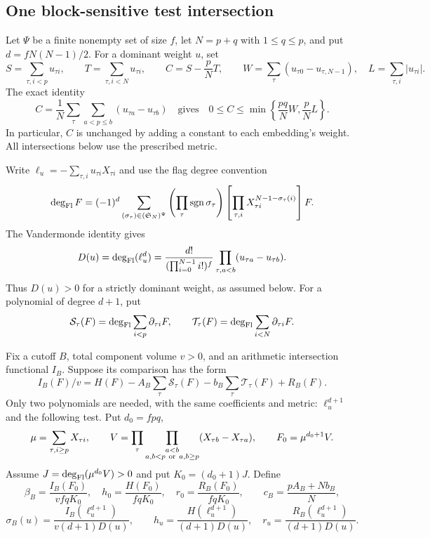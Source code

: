 \subsection{One block-sensitive test intersection}

Let $\Psi$ be a finite nonempty set of size $f$, let $N=p+q$ with
$1\le q\le p$, and put $d=fN(N-1)/2$. For a dominant weight $u$, set
\[
 S=\sum_{\tau,i<p}u_{\tau i},\qquad
 T=\sum_{\tau,i<N}u_{\tau i},\qquad C=S-\frac pN T,\qquad
 W=\sum_\tau(u_{\tau0}-u_{\tau,N-1}),\quad L=\sum_{\tau,i}|u_{\tau i}|.
\]
The exact identity
\[
 C=\frac1N\sum_\tau\sum_{a<p\le b}(u_{\tau a}-u_{\tau b})
 \quad\text{gives}\quad
 0\le C\le\min\left\{\frac{pq}{N}W,\frac pN L\right\}.
\]
In particular, $C$ is unchanged by adding a constant to each
embedding's weight. All intersections below use the prescribed metric.

Write $\ell_u=-\sum_{\tau,i}u_{\tau i}X_{\tau i}$ and use the flag
degree convention
\[
 \deg_{\rm Fl}F=(-1)^d\sum_{(\sigma_\tau)\in(\mathfrak S_N)^\Psi}
 \left(\prod_\tau\operatorname{sgn}\sigma_\tau\right)
 \left[\prod_{\tau,i}X_{\tau i}^{N-1-\sigma_\tau(i)}\right]F.
\]
The Vandermonde identity gives
\[
 D(u)=\deg_{\rm Fl}(\ell_u^d)
 =\frac{d!}{(\prod_{i=0}^{N-1}i!)^f}
             \prod_{\tau,a<b}(u_{\tau a}-u_{\tau b}).
\]
Thus $D(u)>0$ for a strictly dominant weight, as assumed below.
For a polynomial of degree $d+1$, put
\[
 \mathcal S_\tau(F)=\deg_{\rm Fl}\sum_{i<p}\partial_{\tau i}F,
 \qquad
 \mathcal T_\tau(F)=\deg_{\rm Fl}\sum_{i<N}\partial_{\tau i}F.
\]

Fix a cutoff $B$, total component volume $v>0$, and an arithmetic
intersection functional $I_B$. Suppose its comparison has the form
\begin{equation}\label{geo-two-polynomial-comparison}
 I_B(F)/v
 =H(F)-A_B\sum_\tau\mathcal S_\tau(F)
       -b_B\sum_\tau\mathcal T_\tau(F)+R_B(F).
\end{equation}
Only two polynomials are needed, with the same coefficients and metric:
$\ell_u^{d+1}$ and the following test. Put $d_0=fpq$,
\[
 \mu=\sum_{\tau,i\ge p}X_{\tau i},\qquad
 V=\prod_\tau\prod_{\substack{a<b\\a,b<p\ {\rm or}\ a,b\ge p}}
                        (X_{\tau b}-X_{\tau a}),\qquad
 F_0=\mu^{d_0+1}V.
\]
Assume $J=\deg_{\rm Fl}(\mu^{d_0}V)>0$ and put $K_0=(d_0+1)J$.
Define
\[
 \beta_B=\frac{I_B(F_0)}{vfqK_0},\quad
 h_0=\frac{H(F_0)}{fqK_0},\quad r_0=\frac{R_B(F_0)}{fqK_0},
 \qquad c_B=\frac{pA_B+Nb_B}{N},
\]
\[
 \sigma_B(u)=\frac{I_B(\ell_u^{d+1})}{v(d+1)D(u)},\qquad
 h_u=\frac{H(\ell_u^{d+1})}{(d+1)D(u)},\quad
 r_u=\frac{R_B(\ell_u^{d+1})}{(d+1)D(u)}.
\]

